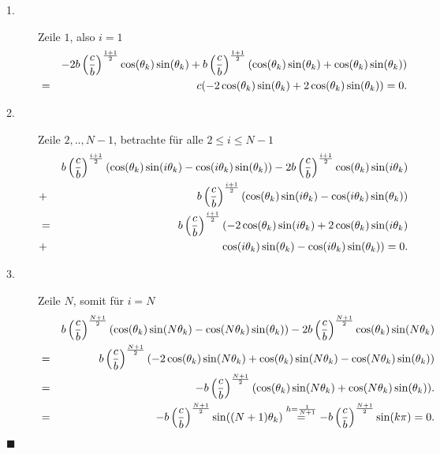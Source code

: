 \begin{description}
\item[1.] Zeile $1$, also $i = 1$
\begin{eqnarray}
&& -2b\left(\frac{c}{b}\right)^{\frac{1+1}{2}} \cos(\theta_{k})\sin(\theta_{k}) + b \left(\frac{c}{b}\right)^{\frac{1+1}{2}} (\cos(\theta_{k}) \sin(\theta_{k}) + \cos(\theta_{k}) \sin(\theta_{k})) \notag \\
&=& c (-2\cos(\theta_{k})\sin(\theta_{k}) + 2\cos(\theta_{k})\sin(\theta_{k})) = 0. \notag
\end{eqnarray}
\item[2.] Zeile $2,..,N-1$, betrachte für alle $2 \le i \le N-1$
\begin{eqnarray}
&& b \left(\frac{c}{b}\right)^{\frac{i+1}{2}} (\cos(\theta_{k}) \sin(i \theta_{k}) - \cos(i \theta_{k}) \sin(\theta_{k})) - 2b\left(\frac{c}{b}\right)^{\frac{i+1}{2}} \cos(\theta_{k})\sin(i \theta_{k}) \notag \\
&+& b \left(\frac{c}{b}\right)^{\frac{i+1}{2}} (\cos(\theta_{k}) \sin(i \theta_{k}) - \cos(i \theta_{k}) \sin(\theta_{k})) \notag \\
&=& b \left(\frac{c}{b}\right)^{\frac{i+1}{2}} (-2\cos(\theta_{k})\sin(i\theta_{k}) + 2\cos(\theta_{k})\sin(i\theta_{k}) \notag \\
&+& \cos(i\theta_{k})\sin(\theta_{k}) - \cos(i\theta_{k})\sin(\theta_{k})) = 0. \notag
\end{eqnarray}
\item[3.] Zeile $N$, somit für $i = N$
\begin{eqnarray}
&& b \left(\frac{c}{b}\right)^{\frac{N+1}{2}} (\cos(\theta_{k}) \sin(N \theta_{k}) - \cos(N \theta_{k}) \sin(\theta_{k})) - 2b\left(\frac{c}{b}\right)^{\frac{N+1}{2}} \cos(\theta_{k})\sin(N \theta_{k}) \notag \\
&=& b \left(\frac{c}{b}\right)^{\frac{N+1}{2}}(-2\cos(\theta_{k})\sin(N\theta_{k}) + \cos(\theta_{k})\sin(N\theta_{k}) - \cos(N\theta_{k})\sin(\theta_{k})) \notag \\
&=& -b \left(\frac{c}{b}\right)^{\frac{N+1}{2}}(\cos(\theta_{k})\sin(N\theta_{k}) + \cos(N\theta_{k})\sin(\theta_{k})). \notag \\
&=& -b \left(\frac{c}{b}\right)^{\frac{N+1}{2}} \sin((N+1)\theta_{k}) \overset{h = \frac{1}{N+1}}{=} -b \left(\frac{c}{b}\right)^{\frac{N+1}{2}} \sin(k\pi) = 0. \notag
\end{eqnarray}
\end{description}
\begin{flushright}
$\blacksquare$
\end{flushright}
